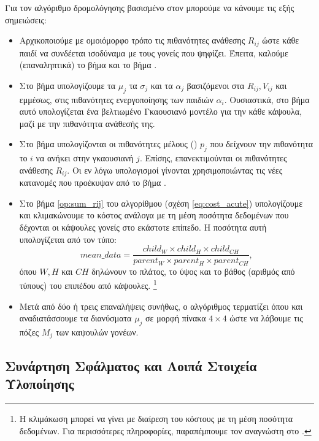 Για τον αλγόριθμο δρομολόγησης βασισμένο στον  μπορούμε να κάνουμε τις εξής σημειώσεις:
\begin{itemize}
  \item Αρχικοποιούμε με ομοιόμορφο τρόπο τις πιθανότητες ανάθεσης $R_{ij}$ ώστε κάθε παιδί να συνδέεται ισοδύναμα με τους γονείς που ψηφίζει. Έπειτα, καλούμε (επαναληπτικά) το βήμα  και το βήμα .
  \item Στο βήμα  υπολογίζουμε τα $\mu_j$ τα $\sigma_j$ και τα $\alpha_j$ βασιζόμενοι στα $R_{ij}, V_{ij}$ και εμμέσως, στις πιθανότητες ενεργοποίησης των παιδιών $\alpha_i$. Ουσιαστικά, στο βήμα αυτό υπολογίζεται ένα βελτιωμένο Γκαουσιανό μοντέλο για την κάθε κάψουλα, μαζί με την πιθανότητα ανάθεσής της. 
  \item Στο βήμα  υπολογίζονται οι πιθανότητες μέλους () $p_j$ που δεί\-χνουν την πιθανότητα το  $i$ να ανήκει στην γκαουσιανή $j$. Επίσης, επανεκτιμούνται οι πιθανότητες ανάθεσης $R_{ij}$. Οι εν λόγω υπολογισμοί γίνονται χρησιμοποιώντας τις νέες κατανομές που προέκυψαν από το βήμα .
  \item Στο βήμα \ref{op:sum_rij} του αλγορίθμου (σχέση \ref{eq:cost_acute}) υπολογίζουμε και κλιμακώνουμε το κόστος ανάλογα με τη μέση ποσότητα δεδομένων που δέχονται οι κάψουλες γονείς στο εκάστοτε επίπεδο. Η ποσότητα αυτή υπολογίζεται από τον τύπο:
  \begin{equation}
    mean\_data = \frac{child_W \times child_H \times child_{CH}}{parent_W \times parent_H \times parent_{CH}},
  \end{equation}
  όπου $W, H$ και $CH$ δηλώνουν το πλάτος, το ύψος και το βάθος (αριθμός από τύπους) του επιπέδου από κάψουλες. \footnote{Η κλιμάκωση μπορεί να γίνει με διαίρεση του κόστους με τη μέση ποσότητα δεδομένων. Για περισσότερες πληροφορίες, παραπέμπουμε τον αναγνώστη στο \cite{gritzman2019avoiding}.}
  \item Μετά από δύο ή τρεις επαναλήψεις συνήθως, ο αλγόριθμος τερματίζει όπου και αναδιατάσσουμε τα διανύσματα $\mu_j$ σε μορφή πίνακα $4 \times 4$ ώστε να λάβουμε τις πόζες $M_j$ των καψουλών γονέων.
\end{itemize}

\subsection{Συνάρτηση Σφάλματος και Λοιπά Στοιχεία Υλοποίησης}

